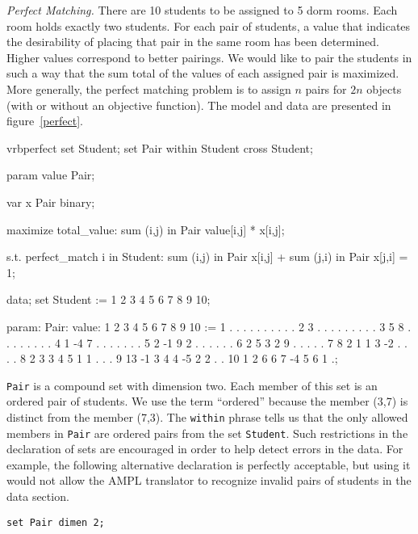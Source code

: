 \emph{Perfect Matching.}
There are 10 students to be assigned to 5 dorm rooms. Each room holds exactly
two students. For each pair of students, a value that indicates the desirability
of placing that pair in the same room has been determined. Higher values 
correspond to better pairings.
We would like to pair the students in such a way that the
sum total of the values of each assigned pair is maximized. More generally,
the perfect matching problem is to assign $n$ pairs for $2n$ objects (with or without
an objective function). The model and data are presented in figure~\ref{perfect}.

\begin{SaveVerbatim}{vrbperfect}
set Student; 
set Pair within Student cross Student;

param value {Pair};

var x {Pair} binary;

maximize total_value: sum {(i,j) in Pair} value[i,j] * x[i,j];

s.t. perfect_match {i in Student}:
	sum {(i,j) in Pair} x[i,j] + sum {(j,i) in Pair} x[j,i] = 1;

data;
set Student := 1 2 3 4 5 6 7 8 9 10;

param: Pair: value:
   1  2  3  4  5  6  7  8  9 10 :=
1  .  .  .  .  .  .  .  .  .  .
2  3  .  .  .  .  .  .  .  .  .
3  5  8  .  .  .  .  .  .  .  .
4  1 -4  7  .  .  .  .  .  .  .
5  2 -1  9  2  .  .  .  .  .  .
6  2  5  3  2  9  .  .  .  .  .
7  8  2  1  1  3 -2  .  .  .  .
8  2  3  3  4  5  1  1  .  .  .
9 13 -1  3  4  4 -5  2  2  .  .
10 1  2  6  6  7 -4  5  6  1  .;
\end{SaveVerbatim}

\begin{figure}
\end{figure}

\texttt{Pair} is a compound set with dimension two. Each member of this set is
an ordered pair of students. We use the term ``ordered'' because the member
(3,7) is distinct from the member (7,3). The \texttt{within} phrase tells
us that the only allowed members in \texttt{Pair} are ordered pairs from the set
\texttt{Student}. Such restrictions in the declaration of sets are encouraged in order to
help detect errors in the data. For example, the following alternative declaration is 
perfectly acceptable, but using it would not allow the AMPL translator to recognize
invalid pairs of students in the data section.
\begin{Verbatim}
set Pair dimen 2;
\end{Verbatim}

